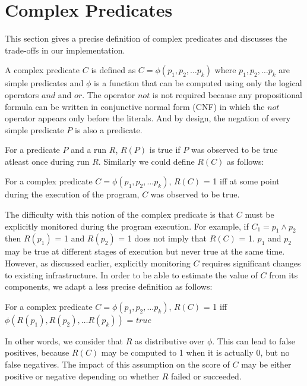 \section{Complex Predicates}
\label{sec-complex-preds}
This section gives a precise definition of complex predicates and discusses the trade-offs in our implementation.

A complex predicate $C$ is defined as $C = \phi(p_1, p_2, \ldots p_k)$ where $p_1, p_2, \ldots p_k$ are simple predicates and $\phi$ is a function that can be computed using only the logical operators $and$ and $or$.  The operator $not$ is not required because any propositional formula can be written in conjunctive normal form (CNF) in which the $not$ operator appears only before the literals.  And by design, the negation of every simple predicate $P$ is also a predicate.

For a predicate $P$ and a run $R$, $R(P)$ is true if $P$ was observed to be true atleast once during run $R$.  Similarly we could define $R(C)$ as follows:
\begin{defn}
\label{dfn1}
For a complex predicate $C = \phi(p_1, p_2, \ldots p_k)$, $R(C)$ = 1 iff at some point during the execution of the program, $C$ was observed to be true.
\end{defn}

The difficulty with this notion of the complex predicate is that $C$ must be explicitly monitored during the program execution.  For example, if $C_1 = p_1 \wedge p_2$ then $R(p_1)$ = 1 and $R(p_2)$ = 1 does not imply that $R(C)$ = 1.  $p_1$ and $p_2$ may be true at different stages of execution but never true at the same time.  However, as discussed earlier, explicitly monitoring $C$ requires significant changes to existing infrastructure.  In order to be able to estimate the value of $C$ from its components, we adapt a less precise definition as follows:
\begin{defn}
\label{dfn2}
For a complex predicate $C = \phi(p_1, p_2, \ldots p_k)$, $R(C)$ = 1 iff $\phi(R(p_1), R(p_2), \ldots R(p_k))$ = $true$
\end{defn}

In other words, we consider that $R$ as distributive over $\phi$.  This can lead to false positives, because $R(C)$ may be computed to 1 when it is actually 0, but no false negatives.  The impact of this assumption on the score of $C$ may be either positive or negative depending on whether $R$ failed or succeeded.

